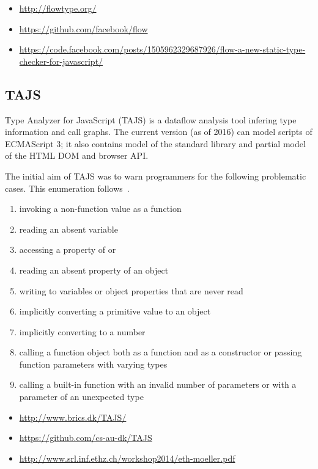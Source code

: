 \begin{itemize}
\item \url{http://flowtype.org/}
\item \url{https://github.com/facebook/flow}
\item \url{https://code.facebook.com/posts/1505962329687926/flow-a-new-static-type-checker-for-javascript/}
\end{itemize}


\subsection{TAJS}
Type Analyzer for JavaScript (TAJS) is a dataflow analysis tool infering type information and call graphs. The current version (as of 2016) can model scripts of ECMAScript 3; it also contains model of the standard library and partial model of the HTML DOM and browser API.~\cite{tajs-git}

The initial aim of TAJS was to warn programmers for the following problematic cases. This enumeration follows~\cite{jensen_type_2009}.

\begin{enumerate}
  \item invoking a non-function value as a function
  \item reading an absent variable
  \item accessing a property of  or 
  \item reading an absent property of an object
  \item writing to variables or object properties that are never read
  \item implicitly converting a primitive value to an object
  \item implicitly converting  to a number
  \item calling a function object both as a function and as a constructor or passing function parameters with varying types
  \item calling a built-in function with an invalid number of parameters or with a parameter of an unexpected type
\end{enumerate}

\begin{itemize}
 \item \url{http://www.brics.dk/TAJS/}
 \item \url{https://github.com/cs-au-dk/TAJS}
 \item \url{http://www.srl.inf.ethz.ch/workshop2014/eth-moeller.pdf}
\end{itemize}


